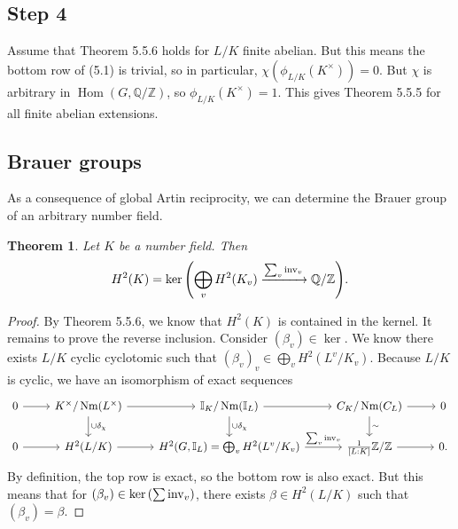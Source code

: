 \documentclass[leqno, openany]{memoir}
\newtheorem{thm}{Theorem}[section]
\theoremstyle{definition}
\theoremstyle{remark}
\theoremstyle{plain}
\theoremstyle{definition}
\theoremstyle{remark}
\newcommand{\Z}{\mathbb{Z}}
\newcommand{\Q}{\mathbb{Q}}
\newcommand{\I}{\mathbb{I}}
\newcommand{\mr}[1]{\mathrm{#1}}
\DeclareMathOperator{\Hom}{Hom}
\DeclareMathOperator{\Nm}{Nm}
\begin{document}
\subsection{Step 4}%
\label{sub:step_4}

Assume that Theorem 5.5.6 holds for $L/K$ finite abelian. But this means the bottom row of (5.1) is trivial, so in particular, $\chi(\phi_{L/K}(K^{\times})) = 0$. But $\chi$ is arbitrary in $\Hom(G, \Q/\Z)$, so $\phi_{L/K}(K^{\times}) = 1$. This gives Theorem 5.5.5 for all finite abelian extensions.

\subsection{Brauer groups}%
\label{sub:brauer_groups}

As a consequence of global Artin reciprocity, we can determine the Brauer group of an arbitrary number field.

\begin{thm}
    Let $K$ be a number field. Then
    \[ H^2(K) = \ker \qty(\bigoplus_v H^2(K_v) \xrightarrow{\sum_v \mr{inv}_v} \Q/\Z). \]
\end{thm}

\begin{proof}
    By Theorem 5.5.6, we know that $H^2(K)$ is contained in the kernel. It remains to prove the reverse inclusion. Consider $(\beta_v) \in \ker$. We know there exists $L/K$ cyclic cyclotomic such that ${(\beta_v)}_v \in \bigoplus_v H^2(L^v/K_v)$. Because $L/K$ is cyclic, we have an isomorphism of exact sequences
    \begin{equation*}
    \begin{tikzcd}
        0 \ar{r} & K^{\times}/\Nm(L^{\times}) \ar{r} \ar{d}{\cup \delta_{\chi}} & \I_K/\Nm(\I_L) \ar{r} \ar{d}{\cup \delta_{\chi}} & C_K/\Nm(C_L) \ar{d}{\sim} \ar{r} & 0 \\
        0 \ar{r} & H^2(L/K) \ar{r} & H^2(G, \I_L) = \bigoplus_v H^2(L^v/K_v) \ar{r}{\sum_v \mr{inv}_v} & \frac{1}{[L:K]} \Z/\Z \ar{r} & 0.
    \end{tikzcd}
    \end{equation*}
    By definition, the top row is exact, so the bottom row is also exact. But this means that for $(\beta_v) \in \ker\qty(\sum \mr{inv}_v)$, there exists $\beta \in H^2(L/K)$ such that $(\beta_v) = \beta$.
\end{proof}
\end{document}
